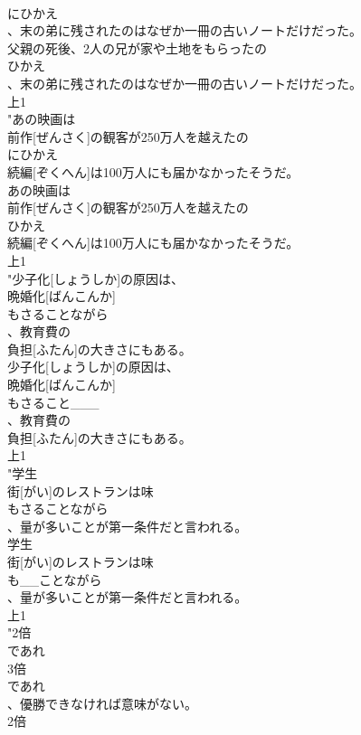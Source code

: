 \documentclass[8pt]{extreport}
\begin{document}
\begin{CJK}{UTF8}{min}
\\	にひかえ
\\	、末の弟に残されたのはなぜか一冊の古いノートだけだった。
\\	父親の死後、2人の兄が家や土地をもらったの
\\	ひかえ
\\	、末の弟に残されたのはなぜか一冊の古いノートだけだった。
\\	上1
\\	"あの映画は
\\	前作[ぜんさく]の観客が250万人を越えたの
\\	にひかえ
\\	続編[ぞくへん]は100万人にも届かなかったそうだ。
\\	あの映画は
\\	前作[ぜんさく]の観客が250万人を越えたの
\\	ひかえ
\\	続編[ぞくへん]は100万人にも届かなかったそうだ。
\\	上1
\\	"少子化[しょうしか]の原因は、
\\	晩婚化[ばんこんか]
\\	もさることながら
\\	、教育費の
\\	負担[ふたん]の大きさにもある。
\\	少子化[しょうしか]の原因は、
\\	晩婚化[ばんこんか]
\\	もさること___
\\	、教育費の
\\	負担[ふたん]の大きさにもある。
\\	上1
\\	"学生
\\	街[がい]のレストランは味
\\	もさることながら
\\	、量が多いことが第一条件だと言われる。
\\	学生
\\	街[がい]のレストランは味
\\	も__ことながら
\\	、量が多いことが第一条件だと言われる。
\\	上1
\\	"2倍
\\	であれ
\\	3倍
\\	であれ
\\	、優勝できなければ意味がない。
\\	2倍

\end{CJK}
\end{document}
